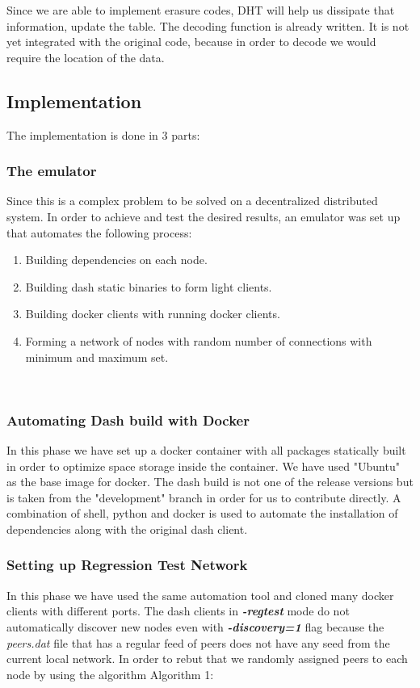 \documentclass[conference]{IEEEtran}
\begin{document}
Since we are able to implement erasure codes, DHT will help us dissipate that information, update the table.
The decoding function is already written. It is not yet integrated with the original code, because in order to
decode we would require the location of the data.


\subsection{Implementation}

The implementation is done in 3 parts: \\

\subsubsection{The emulator}
Since this is a complex problem to be solved on a decentralized distributed
system. In order to achieve and test the desired results, an emulator was set up
that automates the following process: \\

\begin{enumerate}[label=(\alph*)]
    \item Building dependencies on each node.
    \item Building dash static binaries to form light clients.
    \item Building docker clients with running docker clients.
    \item Forming a network of nodes with random number of connections with
        minimum and maximum set.
\end{enumerate}
\\
\subsubsection{Automating Dash build with Docker}
In this phase we have set up a docker container with all packages statically
built in order to optimize space storage inside the container. We have
used "Ubuntu" as the base image for docker. The dash build is not one of the
release versions but is taken from the "development" branch in order for us to
contribute directly. A combination of shell, python and docker is used to
automate the installation of dependencies along with the original dash client. \\

\subsubsection{Setting up Regression Test Network}
In this phase we have used the same automation tool and cloned many docker
clients with different ports. The dash clients in \textbf{\textit{-regtest}}
mode do not automatically discover new nodes even with
\textbf{\textit{-discovery=1}} flag because the \textit{peers.dat} file that has
a regular feed of peers does not have any seed from the current local network.
In order to rebut that we randomly assigned peers to each node by using the
algorithm Algorithm 1: 
\end{document}
